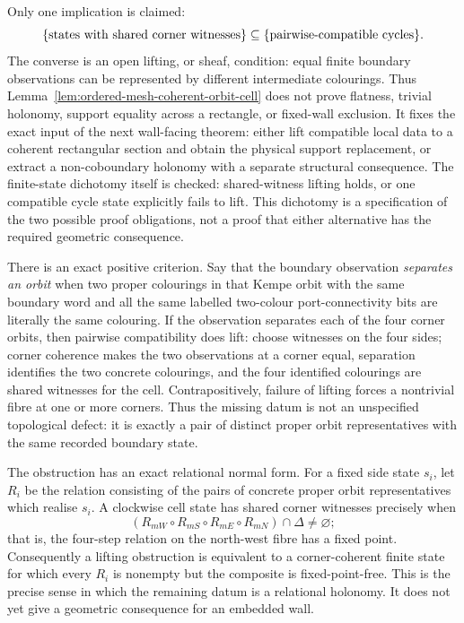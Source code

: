 Only one implication is claimed:
\[
 \{\hbox{states with shared corner witnesses}\}
 \subseteq
 \{\hbox{pairwise-compatible cycles}\}.
\]
The converse is an open lifting, or sheaf, condition: equal finite boundary
observations can be represented by different intermediate colourings.  Thus
Lemma~\ref{lem:ordered-mesh-coherent-orbit-cell} does not prove flatness,
trivial holonomy, support equality across a rectangle, or fixed-wall
exclusion.  It fixes the exact input of the next wall-facing theorem: either
lift compatible local data to a coherent rectangular section and obtain the
physical support replacement, or extract a non-coboundary holonomy with a
separate structural consequence.
The finite-state dichotomy itself is checked: shared-witness lifting holds,
or one compatible cycle state explicitly fails to lift.  This dichotomy is a
specification of the two possible proof obligations, not a proof that either
alternative has the required geometric consequence.

There is an exact positive criterion.  Say that the boundary observation
\emph{separates an orbit} when two proper colourings in that Kempe orbit with
the same boundary word and all the same labelled two-colour port-connectivity
bits are literally the same colouring.  If the observation separates each of
the four corner orbits, then pairwise compatibility does lift: choose witnesses
on the four sides; corner coherence makes the two observations at a corner
equal, separation identifies the two concrete colourings, and the four
identified colourings are shared witnesses for the cell.  Contrapositively,
failure of lifting forces a nontrivial fibre at one or more corners.  Thus the
missing datum is not an unspecified topological defect: it is exactly a pair of
distinct proper orbit representatives with the same recorded boundary state.

The obstruction has an exact relational normal form.  For a fixed side state
$s_i$, let $R_i$ be the relation consisting of the pairs of concrete proper
orbit representatives which realise $s_i$.  A clockwise cell state has shared
corner witnesses precisely when
\[
   (R_{
m W}\circ R_{
m S}\circ R_{
m E}\circ R_{
m N})
      \cap \Delta \ne \varnothing;
\]
that is, the four-step relation on the north-west fibre has a fixed point.
Consequently a lifting obstruction is equivalent to a corner-coherent finite
state for which every $R_i$ is nonempty but the composite is fixed-point-free.
This is the precise sense in which the remaining datum is a relational
holonomy.  It does not yet give a geometric consequence for an embedded wall.

